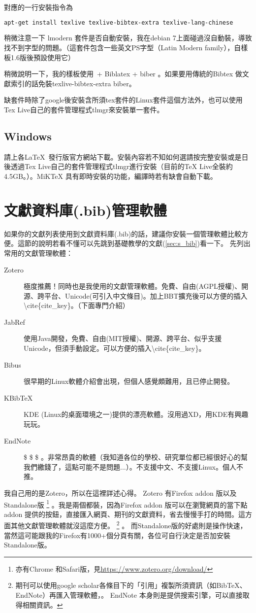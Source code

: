 \documentclass[class=NCU_thesis, crop=false, float=true]{standalone}
\begin{document}
對應的一行安裝指令為
\begin{lstlisting}[style=consoleStyle,language=bash]
apt-get install texlive texlive-bibtex-extra texlive-lang-chinese
\end{lstlisting}

稍微注意一下 lmodern 套件是否自動安裝，我在debian 7上面碰過沒自動裝，導致找不到字型的問題。（這套件包含一些英文PS字型（Latin Modern family），自樣板1.6版後預設使用它）

稍微說明一下，我的樣板使用\XeLaTeX\  + Biblatex + biber 。如果要用傳統的Bibtex 做文獻索引的話免裝texlive-bibtex-extra biber。

缺套件時除了google後安裝含所須tex套件的Linux套件這個方法外，也可以使用Tex Live自己的套件管理程式tlmgr來安裝單一套件。

\subsection{Windows}
請上各\LaTeX\ 發行版官方網站下載。安裝內容若不知如何選請按完整安裝或是日後透過Tex Live自己的套件管理程式tlmgr進行安裝（目前的TeX Live全裝約4.5GB。）。MiKTeX 具有即時安裝的功能，編譯時若有缺會自動下載。

\section{文獻資料庫(.bib)管理軟體}
如果你的文獻列表使用到文獻資料庫(.bib)的話，建議你安裝一個管理軟體比較方便。這節的說明若看不懂可以先跳到基礎教學的文獻(\cref{sec:s_bib})看一下。
先列出常用的文獻管理軟體：
\begin{description}
    \item[Zotero] 極度推薦！同時也是我使用的文獻管理軟體。免費、自由(AGPL授權)、開源、跨平台、Unicode(可引入中文條目)。加上BBT擴充後可以方便的插入\textbackslash{}cite\{cite\_key\}。（下面專門介紹）
    \item[JabRef] 使用Java開發，免費、自由(MIT授權)、開源、跨平台、似乎支援Unicode，但須手動設定。可以方便的插入\textbackslash{}cite\{cite\_key\}。
    \item[Bibus] 很早期的Linux軟體介紹會出現，但個人感覺頗難用，且已停止開發。
    \item[KBibTeX] KDE (Linux的桌面環境之一)提供的漂亮軟體。沒用過XD，用KDE有興趣玩玩。
    \item[EndNote] \$ \$ \$ 。非常昂貴的軟體（我知道各位的學校、研究單位都已經很好心的幫我們繳錢了，這點可能不是問題...）。不支援中文、不支援Linux。個人不推。
\end{description}
我自己用的是Zotero，所以在這裡詳述心得。
Zotero 有Firefox addon 版以及Standalone版
\footnote{亦有Chrome 和Safari版，見\url{https://www.zotero.org/download/}}
。我是兩個都裝，因為Firefox addon 版可以在瀏覽網頁的當下點addon 提供的按鈕，直接匯入網頁、期刊的文獻資料，省去慢慢手打的時間。這方面其他文獻管理軟體就沒這麼方便。
\footnote{期刊可以使用google scholar各條目下的「引用」複製所須資訊（如BibTeX、EndNote）再匯入管理軟體，。 EndNote 本身則是提供搜索引擎，可以直接取得相關資訊。}
。
而Standalone版的好處則是操作快速，當然這可能跟我的Firefox有1000+個分頁有關，各位可自行決定是否加安裝Standalone版。
\end{document}
